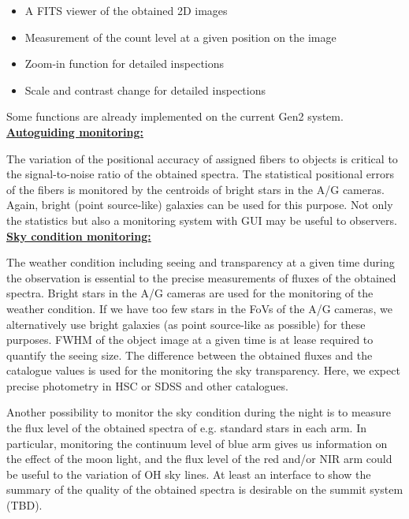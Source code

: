 \documentclass[a4paper]{article}
\begin{document}
\begin{itemize}
\item A FITS viewer of the obtained 2D images
\item Measurement of the count level at a given position on the image
\item Zoom-in function for detailed inspections
\item Scale and contrast change for detailed inspections
\end{itemize}

Some functions are already implemented on the current Gen2 system.\\

\noindent \underline{\textbf{Autoguiding monitoring:}}
\vspace{5pt}

The variation of the positional accuracy of assigned fibers to objects
is critical to the signal-to-noise ratio of the obtained spectra. The
statistical positional errors of the fibers is monitored by the
centroids of bright stars in the A/G cameras. Again, bright (point
source-like) galaxies can be used for this purpose. Not only the
statistics but also a monitoring system with GUI may be useful to
observers.\\

\noindent \underline{\textbf{Sky condition monitoring:}}
\vspace{5pt}

The weather condition including seeing and transparency at a given
time during the observation is essential to the precise measurements
of fluxes of the obtained spectra. Bright stars in the A/G cameras are
used for the monitoring of the weather condition. If we have too few
stars in the FoVs of the A/G cameras, we alternatively use bright
galaxies (as point source-like as possible) for these purposes. FWHM
of the object image at a given time is at lease required to quantify
the seeing size. The difference between the obtained fluxes and the
catalogue values is used for the monitoring the sky
transparency. Here, we expect precise photometry in HSC or SDSS and
other catalogues.

Another possibility to monitor the sky condition during the night is
to measure the flux level of the obtained spectra of e.g. standard
stars in each arm. In particular, monitoring the continuum level of
blue arm gives us information on the effect of the moon light, and the
flux level of the red and/or NIR arm could be useful to the variation
of OH sky lines. At least an interface to show the summary of the
quality of the obtained spectra is desirable on the summit system
(TBD).\\
\end{document}
